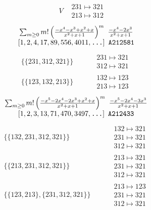 \begin{tiny}
\begin{align}
\quad
&
V
&
\begin{matrix}
231 \mapsto 321\\213 \mapsto 312
\end{matrix}
\end{align}
$$
\begin{matrix}
\sum_{m \geq 0} m! \left(
\frac{-x^{4} - x^{3} + x^{2} + x}{x^{2} + x + 1}
\right)^m
\ 
\frac{-x^{4} - 2 x^{3}}{x^{2} + x + 1}
\\
\left[1, 2, 4, 17, 89, 556, 4011, \text{\texttt{...}}\right]
\ 
\texttt{A212581}
\end{matrix}
$$
\vspace{-1em}
\begin{align}
\{\{231, 312, 321\}\}
\quad
&
\phantom{.}
&
\begin{matrix}
231 \mapsto 321\\312 \mapsto 321
\end{matrix}
\\
\{\{123, 132, 213\}\}
\quad
&
\phantom{.}
&
\begin{matrix}
132 \mapsto 123\\213 \mapsto 123
\end{matrix}
\end{align}
$$
\begin{matrix}
\sum_{m \geq 0} m! \left(
\frac{-x^{5} - 2 x^{4} - 2 x^{3} + x^{2} + x}{x^{2} + x + 1}
\right)^m
\ 
\frac{-x^{5} - 2 x^{4} - 3 x^{3}}{x^{2} + x + 1}
\\
\left[1, 2, 3, 13, 71, 470, 3497, \text{\texttt{...}}\right]
\ 
\texttt{A212433}
\end{matrix}
$$
\vspace{-1em}
\begin{align}
\{\{132, 231, 312, 321\}\}
\quad
&
\phantom{.}
&
\begin{matrix}
132 \mapsto 321\\231 \mapsto 321\\312 \mapsto 321
\end{matrix}
\\
\{\{213, 231, 312, 321\}\}
\quad
&
\phantom{.}
&
\begin{matrix}
213 \mapsto 321\\231 \mapsto 321\\312 \mapsto 321
\end{matrix}
\\
\{\{123, 213\}, \{231, 312, 321\}\}
\quad
&
\phantom{.}
&
\begin{matrix}
213 \mapsto 123\\231 \mapsto 321\\312 \mapsto 321

\end{matrix}
\end{align}
\end{tiny}
